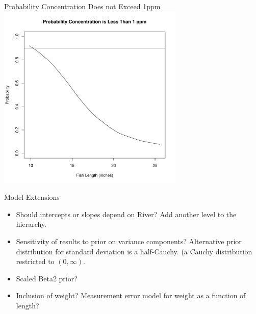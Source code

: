 \documentclass[]{beamer}
\begin{document}
\begin{frame}{Probability Concentration Does not Exceed 1ppm}
  \includegraphics[height=3.5in]{prob}
\end{frame}


\begin{frame}{Model Extensions}
  \begin{itemize}
  \item Should intercepts or slopes depend on River?  Add another
  level to the hierarchy.  \pause
  \item Sensitivity of results to prior on variance components?  \pause
  Alternative prior distribution for standard deviation is a
  half-Cauchy.  (a Cauchy distribution restricted to $(0, \infty)$.
  \pause
\item Scaled Beta2 prior?  
  \item Inclusion of weight?  Measurement error model
  for weight as a function of length?   \pause
  \end{itemize}
  
\end{frame}
\end{document}
